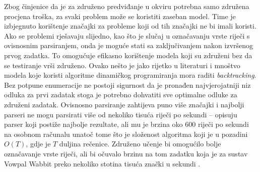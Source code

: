 Zbog činjenice da je za združeno predviđanje u \lts{} okviru potrebna samo
združena procjena troška, za svaki problem može se koristiti zaseban model. Time
je izbjegnuto korištenje značajki za probleme koji od tih značajki ne bi imali
koristi. Ako se problemi rješavaju slijedno, kao što je slučaj u označavanju
vrste riječi s ovisnosnim parsiranjem, onda je moguće stati sa zaključivanjem
nakon izvršenog prvog zadatka. To omogućuje efikasno korištenje modela
koji su združeni bez da se testiranje vrši združeno. Ovako nešto je jako rijetko
u literaturi i mnoštvo modela koje koristi algoritme dinamičkog programiranja
mora raditi \textit{backtracking}. Bez potpune enumeracije ne postoji sigurnost
da je pronađen najvjerojatniji niz odluka za prvi zadatak stoga je potrebno
dohvatiti sve optimalne odluke za združeni zadatak. Ovisnosno parsiranje
zahtijeva puno više značajki i najbolji parseri ne mogu parsirati više od
nekoliko tisuća riječi po sekundi -- \citet{andor2016globally} opisuju parser
koji postiže najbolje rezultate, ali mu je brzina oko 600 riječi po sekundi na
osobnom računalu unatoč tome što je složenost algoritma koji je u pozadini
$O(T)$, gdje je $T$ duljina rečenice. Združeno učenje bi omogućilo bolje
označavanje vrste riječi, ali bi očuvalo brzinu na tom zadatku koja je za sustav
Vowpal Wabbit preko nekoliko stotina tisuća znački u sekundi \citep{daume14lts}.
